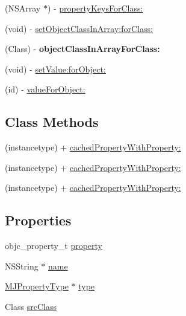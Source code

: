 \begin{DoxyCompactItemize}
\item 
(N\+S\+Array $\ast$) -\/ \mbox{\hyperlink{interface_m_j_property_a0bb60a4e43e9c08eb17f9711c3313690}{property\+Keys\+For\+Class\+:}}
\item 
(void) -\/ \mbox{\hyperlink{interface_m_j_property_a79178c65fd4d34bdf5199bc7775ae5cd}{set\+Object\+Class\+In\+Array\+:for\+Class\+:}}
\item 
\mbox{\label{interface_m_j_property_ad41010eb106e4b2cd772da61abacad62}} 
(Class) -\/ {\bfseries object\+Class\+In\+Array\+For\+Class\+:}
\item 
(void) -\/ \mbox{\hyperlink{interface_m_j_property_a8d2eda5c6273d8346ac9de23a213afd2}{set\+Value\+:for\+Object\+:}}
\item 
(id) -\/ \mbox{\hyperlink{interface_m_j_property_aa7eac0780c2023f169f6194d9e5f66ab}{value\+For\+Object\+:}}
\end{DoxyCompactItemize}
\subsection*{Class Methods}
\begin{DoxyCompactItemize}
\item 
(instancetype) + \mbox{\hyperlink{interface_m_j_property_a74715d87d044518536e2ca6e0b1094fa}{cached\+Property\+With\+Property\+:}}
\item 
(instancetype) + \mbox{\hyperlink{interface_m_j_property_a74715d87d044518536e2ca6e0b1094fa}{cached\+Property\+With\+Property\+:}}
\item 
(instancetype) + \mbox{\hyperlink{interface_m_j_property_a74715d87d044518536e2ca6e0b1094fa}{cached\+Property\+With\+Property\+:}}
\end{DoxyCompactItemize}
\subsection*{Properties}
\begin{DoxyCompactItemize}
\item 
objc\+\_\+property\+\_\+t \mbox{\hyperlink{interface_m_j_property_a07b2dddaf909a75a2660a049910554dd}{property}}
\item 
N\+S\+String $\ast$ \mbox{\hyperlink{interface_m_j_property_ae008e88dc9d7686c520e39a6a9be2050}{name}}
\item 
\mbox{\hyperlink{interface_m_j_property_type}{M\+J\+Property\+Type}} $\ast$ \mbox{\hyperlink{interface_m_j_property_a19d79469fe3b26031bcbfe38c7728189}{type}}
\item 
Class \mbox{\hyperlink{interface_m_j_property_ae4f79e9cf94a84921a8a2284b560e99e}{src\+Class}}
\end{DoxyCompactItemize}


